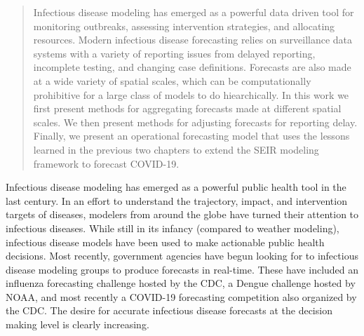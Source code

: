 \documentclass{umassthesis}          %
\begin{document}
\begin{abstract}                %
  Infectious disease modeling has emerged as a powerful data driven tool for monitoring outbreaks, assessing intervention strategies, and allocating resources. Modern infectious disease forecasting relies on surveillance data systems with a variety of reporting issues from delayed reporting, incomplete testing, and changing case definitions. Forecasts are also made at a wide variety of spatial scales, which can be computationally prohibitive for a large class of models to do hiearchically. In this work we first present methods for aggregating forecasts made at different spatial scales. We then present methods for adjusting forecasts for reporting delay. Finally, we present an operational forecasting model that uses the lessons learned in the previous two chapters to extend the SEIR modeling framework to forecast COVID-19.
\end{abstract}



\tableofcontents                %
\listoftables                   %
\listoffigures                  %


\mainmatter   %


   Infectious disease modeling has emerged as a powerful public health tool in the last century. In an effort to understand the trajectory, impact, and intervention targets of diseases, modelers from around the globe have turned their attention to infectious diseases. While still in its infancy (compared to weather modeling), infectious disease models have been used to make actionable public health decisions. Most recently, government agencies have begun looking for to infectious disease modeling groups to produce forecasts in real-time. These have included an influenza forecasting challenge hosted by the CDC, a Dengue challenge hosted by NOAA, and most recently a COVID-19 forecasting competition also organized by the CDC. The desire for accurate infectious disease forecasts at the decision making level is clearly increasing. 
   
\end{document}
